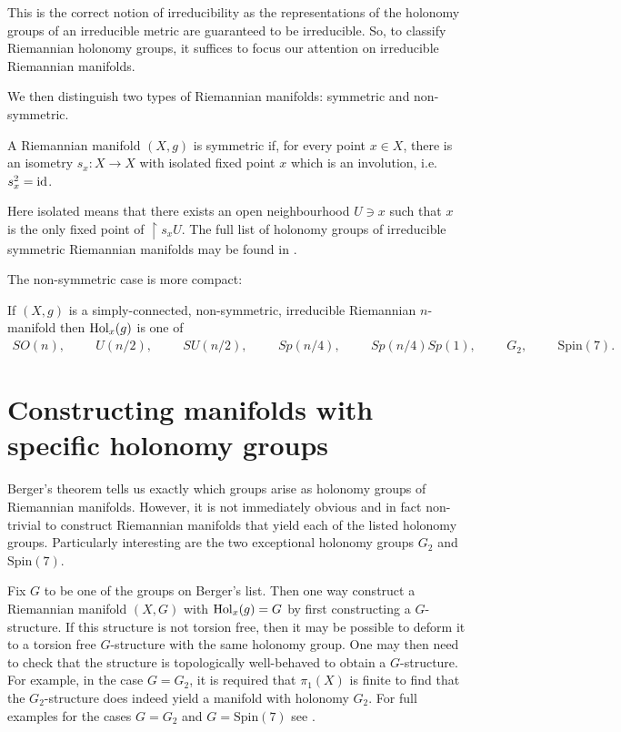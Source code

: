 \documentclass{article}
\begin{document}
This is the correct notion of irreducibility as the representations
of the holonomy groups of an irreducible metric are guaranteed to
be irreducible. So, to classify Riemannian holonomy groups, it suffices
to focus our attention on irreducible Riemannian manifolds.

We then distinguish two types of Riemannian manifolds: symmetric
and non-symmetric.

\begin{definition}
  A Riemannian manifold $(X,g)$ is symmetric if, for every point $x\in X$,
  there is an isometry $s_x : X\to X$ with isolated fixed point $x$ which is
  an involution, i.e. $s_x^2 = \operatorname{id}$.
\end{definition}

Here isolated means that there exists an open neighbourhood $U\ni x$
such that $x$ is the only fixed point of $\restriction{s_x}{U}$.
The full list of holonomy groups of irreducible symmetric Riemannian
manifolds may be found in \cite{besse1987}.

The non-symmetric case is more compact:

\begin{theorem}[Berger]
  If $(X,g)$ is a simply-connected, non-symmetric, irreducible Riemannian
  $n$-manifold then $\operatorname{Hol}_x(g)$ is one of
  \begin{align*}
    SO(n), \hspace{1cm}
    U(n/2), \hspace{1cm}
    SU(n/2), \hspace{1cm}
    Sp(n/4), \hspace{1cm}
    Sp(n/4)Sp(1), \hspace{1cm}
    G_2, \hspace{1cm}
    \text{Spin}(7).
  \end{align*}
\end{theorem}

\section{Constructing manifolds with specific holonomy groups}

Berger's theorem tells us exactly which groups arise as holonomy groups of
Riemannian manifolds. However, it is not immediately obvious and in fact
non-trivial to construct Riemannian manifolds that yield each of the listed
holonomy groups. Particularly interesting are the two exceptional
holonomy groups $G_2$ and $\text{Spin}(7)$.

Fix $G$ to be one of the groups on Berger's list. Then one way
construct a Riemannian manifold $(X,G)$ with $\operatorname{Hol}_x(g)=G$ by
first constructing a $G$-structure. If this structure is not torsion
free, then it may be possible to deform it to a torsion free $G$-structure
with the same holonomy group. One may then need to check
that the structure is topologically well-behaved to obtain a $G$-structure.
For example, in the case $G=G_2$, it is required that $\pi_1(X)$ is
finite to find that the $G_2$-structure does indeed yield a manifold
with holonomy $G_2$. For full examples for the cases $G=G_2$
and $G=\text{Spin}(7)$ see \cite{joyce2007}.

\printbibliography{}
\end{document}
